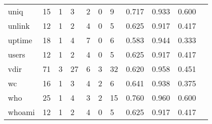 \begin{longtable}{lp{1.10cm}p{1.10cm}p{1.10cm}p{1.10cm}p{1.10cm}p{1.10cm}p{1.10cm}p{1.10cm}p{1.10cm}p{1.10cm}}
uniq      &                     15 &                                  1 &                                 3 &                                2 &                                 0 &                               9 &                          0.717 &                                 0.933 &                               0.600 \\
unlink    &                     12 &                                  1 &                                 2 &                                4 &                                 0 &                               5 &                          0.625 &                                 0.917 &                               0.417 \\
uptime    &                     18 &                                  1 &                                 4 &                                7 &                                 0 &                               6 &                          0.583 &                                 0.944 &                               0.333 \\
users     &                     12 &                                  1 &                                 2 &                                4 &                                 0 &                               5 &                          0.625 &                                 0.917 &                               0.417 \\
vdir      &                     71 &                                  3 &                                27 &                                6 &                                 3 &                              32 &                          0.620 &                                 0.958 &                               0.451 \\
wc        &                     16 &                                  1 &                                 3 &                                4 &                                 2 &                               6 &                          0.641 &                                 0.938 &                               0.375 \\
who       &                     25 &                                  1 &                                 4 &                                3 &                                 2 &                              15 &                          0.760 &                                 0.960 &                               0.600 \\
whoami    &                     12 &                                  1 &                                 2 &                                4 &                                 0 &                               5 &                          0.625 &                                 0.917 &                               0.417 \\

\end{longtable}
